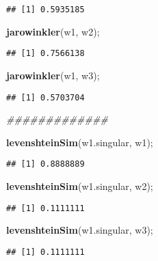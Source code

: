 \documentclass[
]{article}
\newenvironment{Shaded}{\begin{snugshade}}{\end{snugshade}}
\newcommand{\CommentTok}[1]{\textcolor[rgb]{0.56,0.35,0.01}{\textit{#1}}}
\newcommand{\KeywordTok}[1]{\textcolor[rgb]{0.13,0.29,0.53}{\textbf{#1}}}
\newcommand{\NormalTok}[1]{#1}
\begin{document}
\begin{verbatim}
## [1] 0.5935185
\end{verbatim}

\begin{Shaded}
\begin{Highlighting}[]
\KeywordTok{jarowinkler}\NormalTok{(w1, w2);}
\end{Highlighting}
\end{Shaded}

\begin{verbatim}
## [1] 0.7566138
\end{verbatim}

\begin{Shaded}
\begin{Highlighting}[]
\KeywordTok{jarowinkler}\NormalTok{(w1, w3);}
\end{Highlighting}
\end{Shaded}

\begin{verbatim}
## [1] 0.5703704
\end{verbatim}

\begin{Shaded}
\begin{Highlighting}[]
\CommentTok{\#\#\#\#\#\#\#\#\#\#\#\#\#}

\KeywordTok{levenshteinSim}\NormalTok{(w1.singular, w1);}
\end{Highlighting}
\end{Shaded}

\begin{verbatim}
## [1] 0.8888889
\end{verbatim}

\begin{Shaded}
\begin{Highlighting}[]
\KeywordTok{levenshteinSim}\NormalTok{(w1.singular, w2);}
\end{Highlighting}
\end{Shaded}

\begin{verbatim}
## [1] 0.1111111
\end{verbatim}

\begin{Shaded}
\begin{Highlighting}[]
\KeywordTok{levenshteinSim}\NormalTok{(w1.singular, w3);}
\end{Highlighting}
\end{Shaded}

\begin{verbatim}
## [1] 0.1111111
\end{verbatim}
\end{document}
